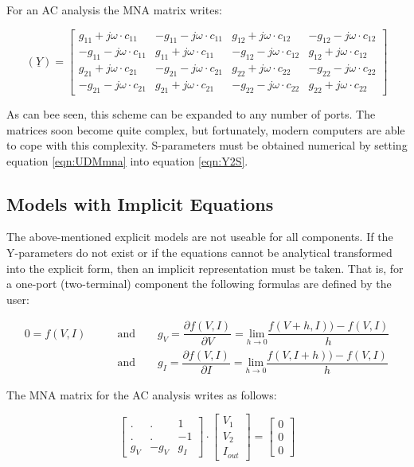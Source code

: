 For an AC analysis the MNA matrix writes:

\begin{equation}
\label{eqn:UDMmna}
(\underline{Y}) =
\begin{bmatrix}
 g_{11} + j\omega\cdot c_{11} & -g_{11} - j\omega\cdot c_{11} &  g_{12} + j\omega\cdot c_{12} & -g_{12} - j\omega\cdot c_{12}\\
-g_{11} - j\omega\cdot c_{11} &  g_{11} + j\omega\cdot c_{11} & -g_{12} - j\omega\cdot c_{12} &  g_{12} + j\omega\cdot c_{12}\\
 g_{21} + j\omega\cdot c_{21} & -g_{21} - j\omega\cdot c_{21} &  g_{22} + j\omega\cdot c_{22} & -g_{22} - j\omega\cdot c_{22}\\
-g_{21} - j\omega\cdot c_{21} &  g_{21} + j\omega\cdot c_{21} & -g_{22} - j\omega\cdot c_{22} &  g_{22} + j\omega\cdot c_{22}
\end{bmatrix}
\end{equation}

As can bee seen, this scheme can be expanded to any number of ports.
The matrices soon become quite complex, but fortunately, modern
computers are able to cope with this complexity.  S-parameters must
be obtained numerical by setting equation \ref{eqn:UDMmna} into
equation \ref{eqn:Y2S}.


\subsection{Models with Implicit Equations}

The above-mentioned explicit models are not useable for all components.
If the Y-parameters do not exist or if the equations cannot be
analytical transformed into the explicit form, then an implicit
representation must be taken. That is, for a one-port (two-terminal)
component the following formulas are defined by the user:

\begin{align}
0 = f(V, I) \qquad & \text{and}\qquad
  g_V = \dfrac{\partial f(V, I)}{\partial V}
      = \underset{h\rightarrow 0}{\text{lim}}\dfrac{f(V+h, I)) - f(V, I)}{h}\\
                   & \text{and}\qquad
  g_I = \dfrac{\partial f(V, I)}{\partial I}
      = \underset{h\rightarrow 0}{\text{lim}}\dfrac{f(V, I+h)) - f(V, I)}{h}
\end{align}

The MNA matrix for the AC analysis writes as follows:

\begin{equation}
\begin{bmatrix}
 . & . &  1\\
 . & . & -1\\
g_V & -g_V &  g_I
\end{bmatrix}
\cdot
\begin{bmatrix}
V_{1}\\
V_{2}\\
I_{out}
\end{bmatrix}
=
\begin{bmatrix}
0\\
0\\
0
\end{bmatrix}
\end{equation}

